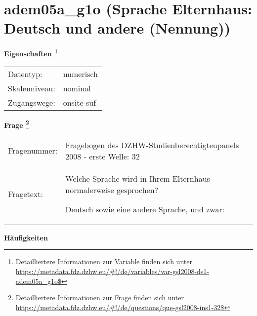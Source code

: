 
    \setcounter{footnote}{0}

    \vspace*{-1.8cm}
	\section{adem05a\_g1o (Sprache Elternhaus: Deutsch und andere (Nennung))}
	\label{section:adem05a_g1o}



    \vspace*{0.5cm}
    \noindent\textbf{Eigenschaften
	\footnote{Detailliertere Informationen zur Variable finden sich unter
		\url{https://metadata.fdz.dzhw.eu/\#!/de/variables/var-gsl2008-ds1-adem05a_g1o$}}}\\
	\begin{tabularx}{\hsize}{@{}lX}
	Datentyp: & numerisch \\
	Skalenniveau: & nominal \\
	Zugangswege: &
	  onsite-suf
 \\
    \end{tabularx}



				\vspace*{0.5cm}
                \noindent\textbf{Frage
	                \footnote{Detailliertere Informationen zur Frage finden sich unter
		              \url{https://metadata.fdz.dzhw.eu/\#!/de/questions/que-gsl2008-ins1-32$}}}\\
				\begin{tabularx}{\hsize}{@{}lX}
					Fragenummer: &
					  Fragebogen des DZHW-Studienberechtigtenpanels 2008 - erste Welle:
					  32
 \\
					Fragetext: & Welche Sprache wird in Ihrem Elternhaus normalerweise gesprochen?\par  Deutsch sowie eine andere Sprache, und zwar: \\
				\end{tabularx}





        		\vspace*{0.5cm}
                \noindent\textbf{Häufigkeiten}

